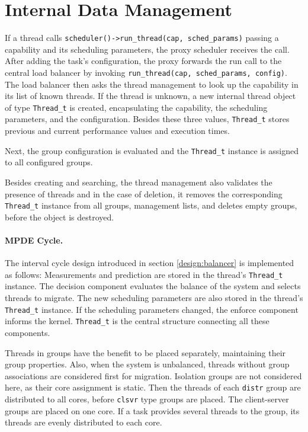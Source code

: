\section{Internal Data Management}
\label{impl:internal}

If a thread calls \texttt{scheduler()->run\_thread(cap, sched\_params)} passing
a capability and its scheduling parameters, the proxy scheduler
receives the call.
After adding the task's configuration, the proxy forwards the run call to the
central load balancer by invoking \texttt{run\_thread(cap, sched\_params, config)}.
The load balancer then asks the thread management to look up the capability in
its list of known threads.
If the thread is unknown, a new internal thread object of type
\texttt{Thread\_t} is created, encapsulating the capability, the scheduling
parameters, and the configuration.
Besides these three values, \texttt{Thread\_t} stores previous and current
performance values and execution times.

Next, the group configuration is evaluated and the \texttt{Thread\_t} instance
is assigned to all configured groups.

Besides creating and searching, the thread management also validates the
presence of threads and in the case of deletion, it removes the corresponding
\texttt{Thread\_t} instance from all groups, management lists, and deletes empty
groups, before the object is destroyed.


\paragraph{MPDE Cycle.}
The interval cycle design introduced in section \ref{design:balancer} is
implemented as follows:
Measurements and prediction are stored in the thread's \texttt{Thread\_t}
instance.
The decision component evaluates the balance of the system and selects threads
to migrate.
The new scheduling parameters are also stored in the thread's \texttt{Thread\_t}
instance.
If the scheduling parameters changed, the enforce component informs the kernel.
\texttt{Thread\_t} is the central structure connecting all these components.

Threads in groups have the benefit to be placed separately, maintaining their
group properties.
Also, when the system is unbalanced, threads without group associations are
considered first for migration.
Isolation groups are not considered here, as their core assignment is static.
Then the threads of each \texttt{distr} group are distributed to all cores, before
\texttt{clsvr} type groups are placed.
The client-server groups are placed on one core.
If a task provides several threads to the group, its threads are evenly
distributed to each core.

